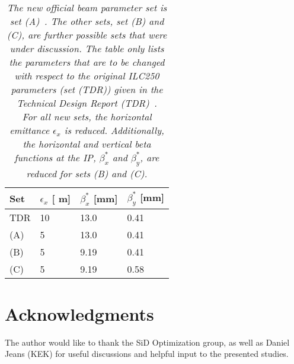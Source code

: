 \documentclass[12pt]{article}
\newcommand{\murm}{%
  \ifmmode
    \mathchoice
        {\hbox{\normalsize\textmu}}
        {\hbox{\normalsize\textmu}}
        {\hbox{\scriptsize\textmu}}
        {\hbox{\tiny\textmu}}%
  \else
    \textmu
  \fi
}
\begin{document}
\begin{table}[h]
\caption{\textit{The new official beam parameter set is set (A)~\cite{CR-0016}.
The other sets, set (B) and (C), are further possible sets that were under discussion.
The table only lists the parameters that are to be changed with respect to the original ILC250 parameters (set (TDR)) given in the Technical Design Report (TDR)~\cite[p. 11]{TDR1}.\\
For all new sets, the horizontal emittance $\epsilon_x$ is reduced. 
Additionally, the horizontal and vertical beta functions at the IP, $\beta^*_x$ and $\beta^*_y$, are reduced for sets (B) and (C).}}
\label{tab:Parameters}
\centering
\begin{tabularx}{0.52\textwidth}{llll}
\hline\hline
\textbf{Set}  & \textbf{$\epsilon_x$ [\murm m]} & \textbf{$\beta^*_x$ [mm]} & \textbf{$\beta^*_y$ [mm]}\\
\hline
\cline{1-4}
\hline
 TDR & 10 & 13.0 & 0.41\\
 \rowcolor{Gray}
 (A) & 5 & 13.0 & 0.41\\
 (B) & 5 & 9.19 & 0.41\\
 (C) & 5 & 9.19 & 0.58\\
\hline\hline
\end{tabularx}
\end{table}







\section*{Acknowledgments}
The author would like to thank the SiD Optimization group, as well as Daniel Jeans (KEK) for useful discussions and helpful input to the presented studies.

%




\end{document}
